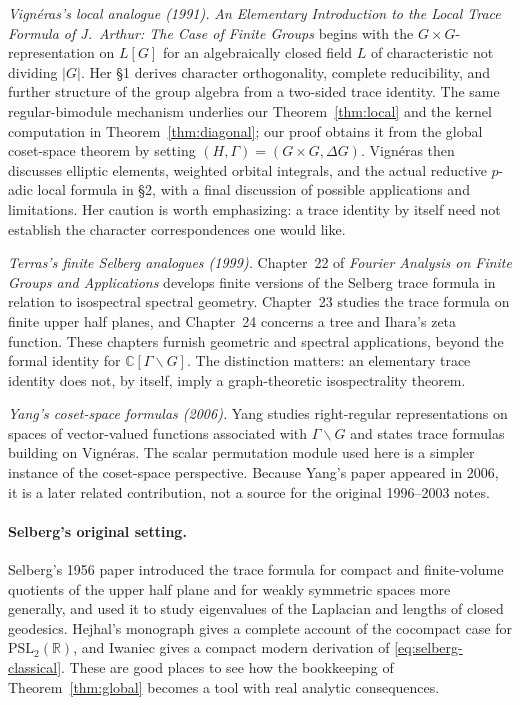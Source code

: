 \documentclass[12pt]{article}
\theoremstyle{remark}
\newcommand{\C}{\mathbb C}
\begin{document}
\smallskip
\noindent\emph{Vign\'eras's local analogue (1991).}
\emph{An Elementary Introduction to the Local Trace Formula of
J.~Arthur: The Case of Finite Groups} \cite{Vigneras1991}
begins with the $G\times G$-representation on $L[G]$ for an
algebraically closed field $L$ of characteristic not dividing $|G|$. Her \S1 derives character
orthogonality, complete reducibility, and further structure of the
group algebra from a two-sided trace identity. The same
regular-bimodule mechanism underlies our
Theorem~\ref{thm:local} and the kernel computation in
Theorem~\ref{thm:diagonal}; our proof obtains it from the global
coset-space theorem by setting $(H,\Gamma)=(G\times G,\Delta G)$.
Vign\'eras then discusses elliptic elements, weighted orbital
integrals, and the actual reductive $p$-adic local formula in \S2,
with a final discussion of possible applications and limitations.
Her caution is worth emphasizing: a trace identity by itself
need not establish the character correspondences one would like.

\smallskip
\noindent\emph{Terras's finite Selberg analogues (1999).}
Chapter~22 of \emph{Fourier Analysis on Finite Groups and
Applications} \cite{Terras1999} develops finite versions of the
Selberg trace formula in relation to isospectral spectral geometry.
Chapter~23 studies the trace formula on finite upper half planes,
and Chapter~24 concerns a tree and Ihara's zeta function.
These chapters furnish geometric and spectral applications,
beyond the formal identity for $\C[\Gamma\backslash G]$.
The distinction matters: an elementary trace identity does not,
by itself, imply a graph-theoretic isospectrality theorem.

\smallskip
\noindent\emph{Yang's coset-space formulas (2006).}
Yang \cite{Yang2006} studies right-regular representations
on spaces of vector-valued functions associated with
$\Gamma\backslash G$ and states trace formulas building on
Vign\'eras. The scalar permutation module used here is a
simpler instance of the coset-space perspective.
Because Yang's paper appeared in 2006, it is a later related
contribution, not a source for the original 1996--2003 notes.

\paragraph{Selberg's original setting.}
Selberg's 1956 paper \cite{Selberg1956} introduced the trace formula
for compact and finite-volume quotients of the upper half plane and
for weakly symmetric spaces more generally, and used it to study
eigenvalues of the Laplacian and lengths of closed geodesics.
Hejhal's monograph \cite{Hejhal1976} gives a complete account of the
cocompact case for $\mathrm{PSL}_2(\mathbb R)$, and Iwaniec
\cite[Ch.~10]{Iwaniec2002} gives a compact modern derivation of
\eqref{eq:selberg-classical}.  These are good places to see how the
bookkeeping of Theorem~\ref{thm:global} becomes a tool with real
analytic consequences.
\end{document}

